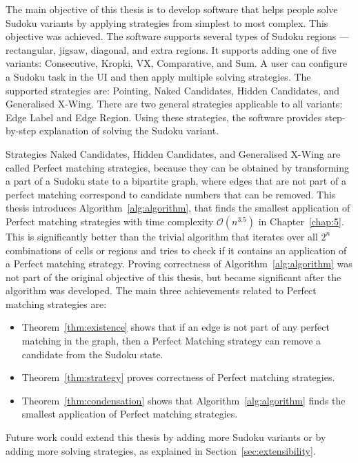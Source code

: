 
The main objective of this thesis is to develop software that helps people solve Sudoku variants
by applying strategies from simplest to most complex.
This objective was achieved.
The software supports several types of Sudoku regions --- rectangular, jigsaw, diagonal, and extra regions.
It supports adding one of five variants: Consecutive, Kropki, VX, Comparative, and Sum.
A user can configure a Sudoku task in the UI and then apply multiple solving strategies.
The supported strategies are: Pointing, Naked Candidates, Hidden Candidates, and Generalised X-Wing.
There are two general strategies applicable to all variants: Edge Label and Edge Region.
Using these strategies, the software provides step-by-step explanation of solving the Sudoku variant.

Strategies Naked Candidates, Hidden Candidates, and Generalised X-Wing are called Perfect matching strategies,
because they can be obtained by transforming a part of a Sudoku state to a bipartite graph,
where edges that are not part of a perfect matching correspond to candidate numbers that can be removed.
This thesis introduces Algorithm~\ref{alg:algorithm}, that finds the smallest application of
Perfect matching strategies with time complexity $\mathcal{O}(n^{3.5})$ in Chapter~\ref{chap:5}.
This is significantly better than the trivial algorithm that iterates over all $2^n$ combinations of
cells or regions and tries to check if it contains an application of a Perfect matching strategy.
Proving correctness of Algorithm~\ref{alg:algorithm} was not part of the original objective of this thesis,
but became significant after the algorithm was developed.
The main three achievements related to Perfect matching strategies are:
\begin{itemize}
    \item Theorem~\ref{thm:existence} shows that if an edge is not part of any perfect matching in the graph,
            then a Perfect Matching strategy can remove a candidate from the Sudoku state.
    \item Theorem~\ref{thm:strategy} proves correctness of Perfect matching strategies.
    \item Theorem~\ref{thm:condensation} shows
            that Algorithm~\ref{alg:algorithm} finds the smallest application of Perfect matching strategies.
\end{itemize}

Future work could extend this thesis by adding more Sudoku variants or by adding more solving strategies,
as explained in Section~\ref{sec:extensibility}.

